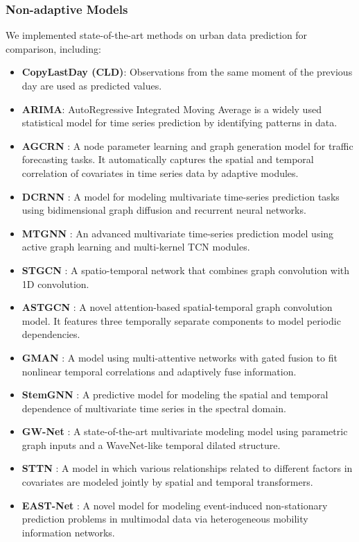 \documentclass[sigconf]{acmart}
\begin{document}
\subsubsection{Non-adaptive Models}
We implemented state-of-the-art methods on urban data prediction for comparison, including:
\begin{itemize}
    \item \textbf{CopyLastDay (CLD)}: Observations from the same moment of the previous day are used as predicted values.
    \item \textbf{ARIMA}: AutoRegressive Integrated Moving Average is a widely used statistical model for time series prediction by identifying patterns in data.
    \item \textbf{AGCRN} \cite{bai2020adaptive}: A node parameter learning and graph generation model for traffic forecasting tasks. It automatically captures the spatial and temporal correlation of covariates in time series data by adaptive modules.
    \item \textbf{DCRNN} \cite{li2018diffusion}: A model for modeling multivariate time-series prediction tasks using bidimensional graph diffusion and recurrent neural networks.
    \item \textbf{MTGNN} \cite{wu2020connecting}: An advanced multivariate time-series prediction model using active graph learning and multi-kernel TCN modules.
    \item \textbf{STGCN} \cite{yu2018spatio}: A spatio-temporal network that combines graph convolution with 1D convolution.
    \item \textbf{ASTGCN} \cite{guo2019attention}: A novel attention-based spatial-temporal graph convolution model. It features three temporally separate components to model periodic dependencies.
    \item \textbf{GMAN} \cite{zheng2020gman}: A model using multi-attentive networks with gated fusion to fit nonlinear temporal correlations and adaptively fuse information.
    \item \textbf{StemGNN} \cite{cao2020spectral}: A predictive model for modeling the spatial and temporal dependence of multivariate time series in the spectral domain.
    \item \textbf{GW-Net} \cite{wu2019graph}: A state-of-the-art multivariate modeling model using parametric graph inputs and a WaveNet-like temporal dilated structure.
    \item \textbf{STTN} \cite{xu2020spatial}: A model in which various relationships related to different factors in covariates are modeled jointly by spatial and temporal transformers.
    \item \textbf{EAST-Net} \cite{wang2022event}: A novel model for modeling event-induced non-stationary prediction problems in multimodal data via heterogeneous mobility information networks.
\end{itemize}
\end{document}
